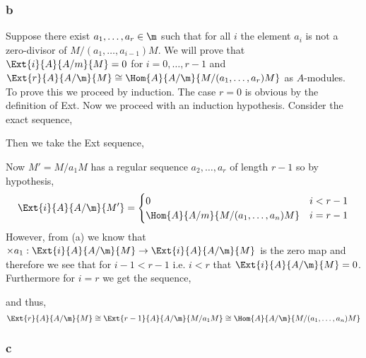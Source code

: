 \documentclass[12pt]{article}
\begin{document}
\subsubsection{b} 

Suppose there exist $a_1, \dots, a_r \in \m$ such that for all $i$ the element $a_i$ is not a zero-divisor of $M / (a_1, \dots, a_{i-1}) M$. We will prove that $\Ext{i}{A}{A/m}{M} = 0$ for $i = 0, \dots, r-1$ and $\Ext{r}{A}{A/\m}{M} \cong \Hom{A}{A/\m}{M/(a_1, \dots, a_r) M}$ as $A$-modules.
\bigskip\\
To prove this we proceed by induction. The case $r = 0$ is obvious by the definition of Ext. Now we proceed with an induction hypothesis. Consider the exact sequence,
\begin{center}
\end{center}
Then we take the Ext sequence,
\begin{center}
\end{center}
Now $M' = M / a_1 M$ has a regular sequence $a_2, \dots, a_r$ of length $r-1$ so by hypothesis,
\[ \Ext{i}{A}{A/\m}{M'} = 
\begin{cases}
0  & i < r - 1
\\
\Hom{A}{A/m}{M/(a_1, \dots, a_n) M} & i = r-1
\end{cases} \]
However, from (a) we know that $\times a_1 : \Ext{i}{A}{A / \m}{M} \to \Ext{i}{A}{A/\m}{M}$ is the zero map and therefore we see that for $i - 1 < r - 1$ i.e. $i < r$ that $\Ext{i}{A}{A/\m}{M} = 0$. Furthermore for $i = r$ we get the sequence,
\begin{center}
\end{center}
and thus,
\[ \Ext{r}{A}{A/\m}{M} \cong \Ext{r-1}{A}{A/\m}{M/a_1 M} \cong \Hom{A}{A/\m}{M/(a_1, \dots, a_n)M} \]

\subsubsection{c}
\end{document}
